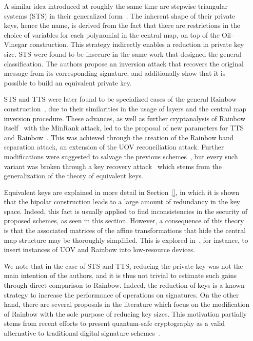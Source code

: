 \documentclass[draft, 12pt, a4paper, oneside]{memoir}
\theoremstyle{definition}
\theoremstyle{remark}
\begin{document}
A similar idea introduced at roughly the same time are stepwise triangular systems (STS) in their generalized form~\cite{Wolf:200603}. The inherent shape of their private keys, hence the name, is derived from the fact that there are restrictions in the choice of variables for each polynomial in the central map, on top of the Oil--Vinegar construction. This strategy indirectly enables a reduction in private key size. STS were found to be insecure in the same work that designed the general classification. The authors propose an inversion attack that recovers the original message from its corresponding signature, and additionally show that it is possible to build an equivalent private key.

STS and TTS were later found to be specialized cases of the general Rainbow construction~\cite{Ding:200806}, due to their similarities in the usage of layers and the central map inversion procedure. These advances, as well as further cryptanalysis of Rainbow itself~\cite{Billet:200609} with the MinRank attack, led to the proposal of new parameters for TTS and Rainbow~\cite{Ding:200806}. This was achieved through the creation of the Rainbow band separation attack, an extension of the UOV reconciliation attack. Further modifications were suggested to salvage the previous schemes~\cite{Tsujii:201005}, but every such variant was broken through a key recovery attack~\cite{Thomae:201207} which stems from the generalization of the theory of equivalent keys.

Equivalent keys are explained in more detail in Section~\ref{}, in which it is shown that the bipolar construction leads to a large amount of redundancy in the key space. Indeed, this fact is usually applied to find inconsistencies in the security of proposed schemes, as seen in this section. However, a consequence of this theory is that the associated matrices of the affine transformations that hide the central map structure may be thoroughly simplified. This is explored in~\cite{Czypek:201209}, for instance, to insert instances of UOV and Rainbow into low-resource devices.

We note that in the case of STS and TTS, reducing the private key was not the main intention of the authors, and it is thus not trivial to estimate such gains through direct comparison to Rainbow. Indeed, the reduction of keys is a known strategy to increase the performance of operations on signatures. On the other hand, there are several proposals in the literature which focus on the modification of Rainbow with the sole purpose of reducing key sizes. This motivation partially stems from recent efforts to present quantum-safe cryptography as a valid alternative to traditional digital signature schemes~\cite{Bernstein:2008}.
\end{document}
